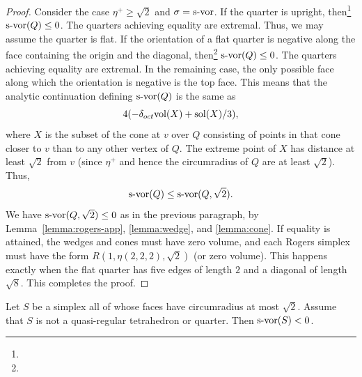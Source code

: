 \begin{proof}
Consider the case $\eta^+\ge\sqrt2$ and $\sigma=\operatorname{s-vor}$. If the
quarter is upright, then\footnote{} $\operatorname{s-vor}(Q)\le0$.
The quarters achieving equality are extremal.
Thus, we may assume the quarter is flat.  If the orientation of a
flat quarter is negative along the face containing the origin and
the diagonal, then\footnote{} $\operatorname{s-vor}(Q)\le0$. The
quarters achieving equality are extremal.
In the remaining case, the only possible face along which the
orientation is negative is the top face.  This means that the
analytic continuation defining $\operatorname{s-vor}(Q)$ is the same as
    $$4(-\delta_{oct}{\operatorname{vol}}(X) + \operatorname{sol}(X)/3),$$
where $X$ is the subset of the cone at $v$ over $Q$ consisting of
points in that cone closer to $v$ than to any other vertex of $Q$.
The extreme point of $X$ has distance at least $\sqrt2$ from $v$
(since $\eta^+$ and hence the circumradius of $Q$ are at least
$\sqrt2$).  Thus,
    $$\operatorname{s-vor}(Q) \le \operatorname{s-vor}(Q,\sqrt2).$$
We have $\operatorname{s-vor}(Q,\sqrt2)\le0$ as in the previous paragraph, by
Lemma~\ref{lemma:rogers-app}, \ref{lemma:wedge}, and
\ref{lemma:cone}. If equality is attained, the wedges and cones
must have zero volume, and each Rogers simplex must have the form
$R(1,\eta(2,2,2),\sqrt2)$ (or zero volume). This happens exactly
when the flat quarter has five edges of length $2$ and a diagonal
of length $\sqrt8$.  This completes the proof. \end{proof}

\begin{lemma} \label{lemma:simplex0}
Let $S$ be a simplex all of whose faces have circumradius at most
$\sqrt2$.  Assume that $S$ is not a quasi-regular tetrahedron or
quarter.  Then $\operatorname{s-vor}(S)<0$.
\end{lemma}

